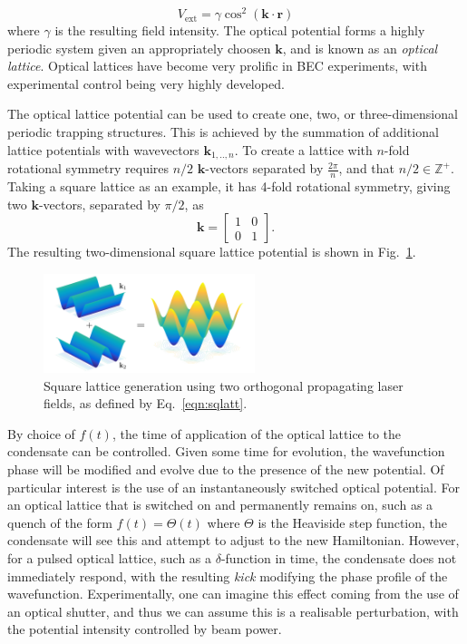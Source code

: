 \begin{equation}
    V_{\textrm{ext}} = \gamma \cos^2 (\mathbf{k} \cdot \mathbf{r})
\end{equation}
where $\gamma$ is the resulting field intensity. The optical potential forms a highly periodic system given an appropriately choosen $\mathbf{k}$, and is known as an \textit{optical lattice}. Optical lattices have become very prolific in BEC experiments, with experimental control being very highly developed.

The optical lattice potential can be used to create one, two, or three-dimensional periodic trapping structures. This is achieved by the summation of additional lattice potentials with wavevectors $\mathbf{k}_{1,..,n}$. To create a lattice with $n$-fold rotational symmetry requires $n/2$ $\mathbf{k}$-vectors separated by $\frac{2\pi}{n}$, and that $n/2 \in \mathbb{Z}^{+}$. Taking a square lattice as an example, it has 4-fold rotational symmetry, giving two $\mathbf{k}$-vectors, separated by $\pi/2$, as
\begin{equation}
    \mathbf{k} =
    \begin{bmatrix}
     1 & 0 \\
     0 & 1
    \end{bmatrix}.\label{eqn:sqlatt}
\end{equation}
The resulting two-dimensional square lattice potential is shown in Fig.~\ref{fig:cos2xy}.
\begin{figure}\centering
    \includegraphics[width=0.55\textwidth]{./Images/ch4_vtx/VOPT/squarelatt}
    \caption{Square lattice generation using two orthogonal propagating laser fields, as defined by Eq.~\ref{eqn:sqlatt}.}\label{fig:cos2xy}
\end{figure}
By choice of $f(t)$, the time of application of the optical lattice to the condensate can be controlled. Given some time for evolution, the wavefunction phase will be modified and evolve due to the presence of the new potential. Of particular interest is the use of an instantaneously switched optical potential. For an optical lattice that is switched on and permanently remains on, such as a quench of the form $f(t) = \Theta(t)$ where $\Theta$ is the Heaviside step function, the condensate will see this and attempt to adjust to the new Hamiltonian. However, for a pulsed optical lattice, such as a $\delta$-function in time, the condensate does not immediately respond, with the resulting \textit{kick} modifying the phase profile of the wavefunction. Experimentally, one can imagine this effect coming from the use of an optical shutter, and thus we can assume this is a realisable perturbation, with the potential intensity controlled by beam power.

